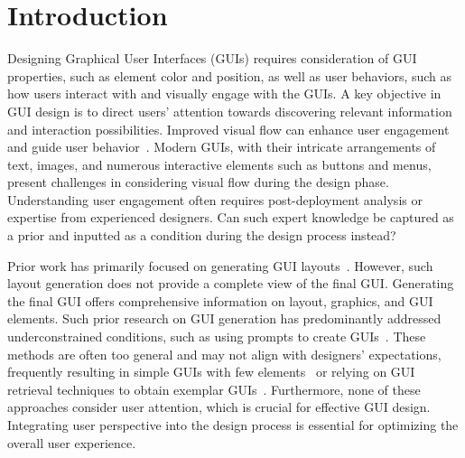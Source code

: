 \section{Introduction}




Designing Graphical User Interfaces (GUIs) requires consideration of GUI properties, such as element color and position, as well as user behaviors, such as how users interact with and visually engage with the GUIs.
A key objective in GUI design is to direct users’ attention towards discovering relevant information and interaction possibilities.
Improved visual flow can enhance user engagement and guide user behavior~\cite{Rosenholtz11, Still10, ueyes}. 
Modern GUIs, with their intricate arrangements of text, images, and numerous interactive elements such as buttons and menus, present challenges in considering visual flow during the design phase.
Understanding user engagement often requires post-deployment analysis or expertise from experienced designers. 
Can such expert knowledge be captured as a prior and inputted as a condition during the design process instead?


Prior work has primarily focused on generating GUI layouts~\cite{cheng2023play, cheng2024colay}. 
However, such layout generation does not provide a complete view of the final GUI. 
Generating the final GUI offers comprehensive information on layout, graphics, and GUI elements. 
Such prior research on GUI generation has predominantly addressed underconstrained conditions, such as using prompts to create GUIs~\cite{}. 
These methods are often too general and may not align with designers' expectations, frequently resulting in simple GUIs with few elements~\cite{} or relying on GUI retrieval techniques to obtain exemplar GUIs~\cite{}. 
Furthermore, none of these approaches consider user attention, which is crucial for effective GUI design. 
Integrating user perspective into the design process is essential for optimizing the overall user experience.


